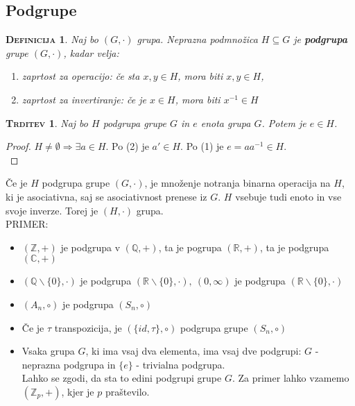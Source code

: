 \documentclass[a4paper,12pt]{article}
\newtheorem*{trditev}{\textsc{Trditev}}
\newtheorem*{definicija}{\textsc{Definicija}}
\begin{document}
\newpage

\begin{center}
\subsection{Podgrupe}
\end{center}

\begin{definicija}
Naj bo $(G,\cdot)$ grupa. Neprazna podmnožica $H\subseteq G$ je \textbf{podgrupa} grupe $(G,\cdot)$, kadar velja:
\begin{enumerate}
\item[(1)] zaprtost za operacijo: če sta $x,y\in H$, mora biti $x,y\in H$,
\item[(2)] zaprtost za invertiranje: če je $x\in H$, mora biti $x^{-1}\in H$\\
\end{enumerate}
\end{definicija}

\begin{trditev}
Naj bo $H$ podgrupa grupe $G$ in $e$ enota grupa $G$. Potem je $e\in H$.\\
\end{trditev}

\begin{proof}
$H\neq \emptyset \Rightarrow \exists a \in H$. Po (2) je $a'\in H$. Po (1) je $e=aa^{-1}\in H$. \\
\end{proof}

\noindent Če je $H$ podgrupa grupe $(G,\cdot)$, je množenje notranja binarna operacija na $H$, ki je asociativna, saj se asociativnost prenese iz $G$. $H$ vsebuje tudi enoto in vse svoje inverze. Torej je $(H,\cdot)$ grupa.\\

\noindent PRIMER:
\begin{itemize}
\item $(\mathbb{Z},+)$ je podgrupa v $(\mathbb{Q},+)$, ta je pogrupa $(\mathbb{R},+)$, ta je podgrupa $(\mathbb{C},+)$
\item $(\mathbb{Q} \backslash \{0\},\cdot)$ je podgrupa $(\mathbb{R} \backslash \{0\},\cdot),~(0,\infty)$ je podgrupa $(\mathbb{R} \backslash \{0\},\cdot)$
\item $(A_n,\circ)$ je podgrupa $(S_n,\circ)$
\item Če je $\tau$ transpozicija, je $(\{id,\tau\},\circ)$ podgrupa grupe $(S_n,\circ)$
\item Vsaka grupa $G$, ki ima vsaj dva elementa, ima vsaj dve podgrupi: \linebreak $G$ - neprazna podgrupa in $\{e\}$ - trivialna podgrupa. \\

Lahko se zgodi, da sta to edini podgrupi grupe $G$. Za primer lahko vzamemo $(\mathbb{Z}_p,+)$, kjer je $p$ praštevilo.\\
\end{itemize}
\end{document}
